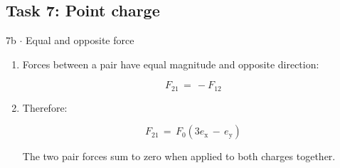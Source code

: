 \documentclass[11pt]{article}
\begin{document}
\begin{keepsection}\subsection{Task 7: Point charge}

\begin{workedbox}{7b \ensuremath{\cdot} Equal and opposite force}
\begin{enumerate}
\item {}
Forces between a pair have equal magnitude and opposite direction:

\begin{equation*}{F}_{21}\, =\, -{F}_{12}\end{equation*}
\item {}
Therefore:

\begin{equation*}{F}_{21}\, =\, {F}_{0}(3{e}_{\mathrm{x}}\, -\, {e}_{\mathrm{y}})\end{equation*}

The two pair forces sum to zero when applied to both charges together.
\end{enumerate}
\end{workedbox}

\end{keepsection}
\end{document}
